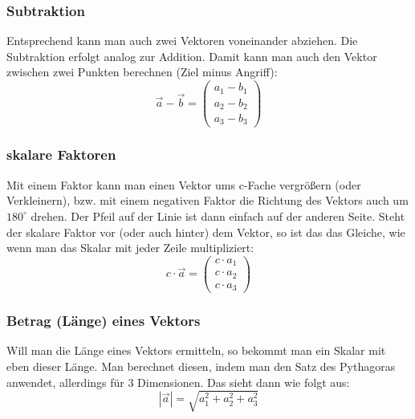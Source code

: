 	\subsubsection{Subtraktion}
		Entsprechend kann man auch zwei Vektoren voneinander abziehen. Die Subtraktion
		erfolgt analog zur Addition. Damit kann man auch den Vektor zwischen zwei
		Punkten berechnen (Ziel minus Angriff):
		\[\vec{a}-\vec{b}=\begin{pmatrix}
		 a_1-b_1\\
		 a_2-b_2\\
		 a_3-b_3
		\end{pmatrix}\]

	\subsubsection{skalare Faktoren}
		Mit einem Faktor kann man einen Vektor ums c-Fache vergrößern (oder
		Verkleinern), bzw. mit einem negativen Faktor die Richtung des Vektors auch um
		\(180^{\circ}\) drehen. Der Pfeil auf der Linie ist dann einfach auf der
		anderen Seite. Steht der skalare Faktor vor (oder auch hinter) dem Vektor, so
		ist das das Gleiche, wie wenn man das Skalar mit jeder Zeile multipliziert:
		\[c\cdot \vec{a}=
		\begin{pmatrix}
		 c\cdot a_1\\
		 c\cdot a_2\\
		 c\cdot a_3
		\end{pmatrix}
		\]
	
	\subsubsection{Betrag (Länge) eines Vektors}
		Will man die Länge eines Vektors ermitteln, so bekommt man ein Skalar mit eben
		dieser Länge. Man berechnet diesen, indem man den Satz des Pythagoras
		anwendet, allerdings für 3 Dimensionen. Das sieht dann wie folgt aus:
		\[|\vec{a}|=\sqrt{a_1^2+a_2^2+a_3^2}\]
	
